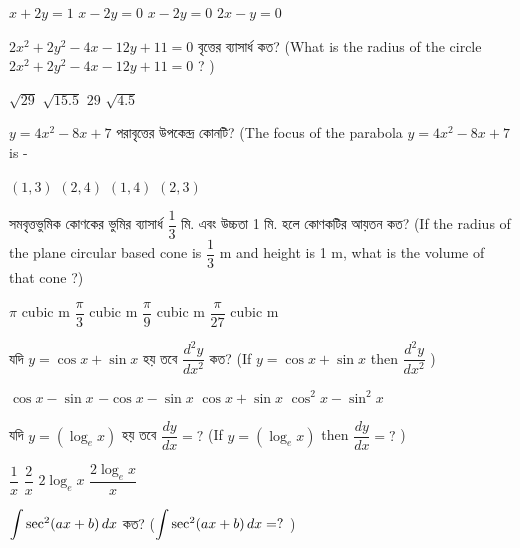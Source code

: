 \documentclass[addpoints]{exam}
\begin{document}
\begin{questions}
\begin{oneparchoices}
\choice $ x+2y= 1 $
\choice $ x-2y= 0 $ 
\choice $ x-2y=0 $
\choice $ 2x-y=0 $
\end{oneparchoices}

\question $ 2x^{2}+2y^{2}-4x-12y+11=0 $ বৃত্তের ব্যাসার্ধ কত? (What is the radius of the circle $ 2x^{2}+2y^{2}-4x-12y+11=0 $ ? )  

\begin{oneparchoices}
\choice $ \sqrt{29} $
\choice $ \sqrt{15.5} $
\choice $ 29 $
\choice $ \sqrt{4.5} $
\end{oneparchoices}


\question $ y =4x^{2}-8x+7 $ পরাবৃত্তের উপকেন্দ্র কোনটি? (The focus of the parabola $ y =4x^{2}-8x+7 $ is -


\begin{oneparchoices}
\choice  $ (1,3) $
\choice  $ (2,4) $
\choice  $ (1,4) $
\choice  $ (2,3) $
\end{oneparchoices}


\question সমবৃত্তভুমিক কোণকের ভুমির ব্যাসার্ধ $ \dfrac{1}{3} $ মি. এবং উচ্চতা 1 মি. হলে কোণকটির আয়তন কত? (If the radius of the plane circular based cone is $ \dfrac{1}{3} $ m and height is 1 m, what is the volume of that cone ?)

\begin{oneparchoices}
\choice $ \pi $ cubic m
\choice $ \dfrac{\pi}{3} $ cubic m
\choice $ \dfrac{\pi}{9} $ cubic m
\choice $ \dfrac{\pi}{27} $ cubic m
\end{oneparchoices}

\question যদি $ y=\cos x + \sin x $ হয় তবে $ \dfrac{d^{2}y}{dx^{2}} $ কত? (If $ y=\cos x + \sin x $ then $ \dfrac{d^{2}y}{dx^{2}} $ )

\begin{oneparchoices}
\choice $ \cos x -\sin x $
\choice $ -\cos x -\sin x $
\choice $ \cos x + \sin x $
\choice $ \cos^{2}x - \sin^{2}x $
\end{oneparchoices}

\question  যদি $ y = (\log_{e}x) $ হয় তবে $ \dfrac{dy}{dx}=? $ (If $ y = (\log_{e}x) $ then $ \dfrac{dy}{dx}=? $ )

\begin{oneparchoices}
\choice $ \dfrac{1}{x} $
\choice $ \dfrac{2}{x} $
\choice $ 2\log_{e}x $
\choice $ \dfrac{2\log_{e}x}{x} $
\end{oneparchoices}

\question  $ \mathlarger{\int}\sec^{2}(ax+b)\,dx $ কত? ($ \mathlarger{\int}\sec^{2}(ax+b)\,dx =? $ )


\end{questions}
\end{document}
